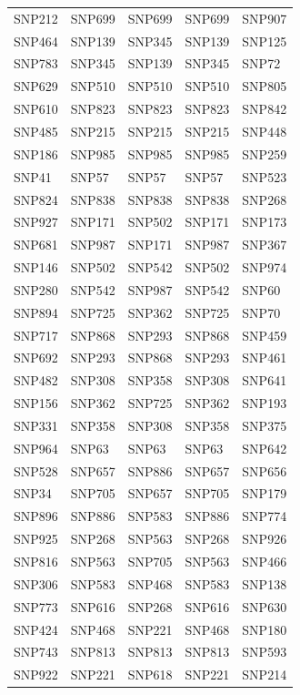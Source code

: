 \begin{table}[ht]
\begin{tabular}{lllll}
  SNP212 & SNP699 & SNP699 & SNP699 & SNP907 \\ 
  SNP464 & SNP139 & SNP345 & SNP139 & SNP125 \\ 
  SNP783 & SNP345 & SNP139 & SNP345 & SNP72 \\ 
  SNP629 & SNP510 & SNP510 & SNP510 & SNP805 \\ 
  SNP610 & SNP823 & SNP823 & SNP823 & SNP842 \\ 
  SNP485 & SNP215 & SNP215 & SNP215 & SNP448 \\ 
  SNP186 & SNP985 & SNP985 & SNP985 & SNP259 \\ 
  SNP41 & SNP57 & SNP57 & SNP57 & SNP523 \\ 
  SNP824 & SNP838 & SNP838 & SNP838 & SNP268 \\ 
  SNP927 & SNP171 & SNP502 & SNP171 & SNP173 \\ 
  SNP681 & SNP987 & SNP171 & SNP987 & SNP367 \\ 
  SNP146 & SNP502 & SNP542 & SNP502 & SNP974 \\ 
  SNP280 & SNP542 & SNP987 & SNP542 & SNP60 \\ 
  SNP894 & SNP725 & SNP362 & SNP725 & SNP70 \\ 
  SNP717 & SNP868 & SNP293 & SNP868 & SNP459 \\ 
  SNP692 & SNP293 & SNP868 & SNP293 & SNP461 \\ 
  SNP482 & SNP308 & SNP358 & SNP308 & SNP641 \\ 
  SNP156 & SNP362 & SNP725 & SNP362 & SNP193 \\ 
  SNP331 & SNP358 & SNP308 & SNP358 & SNP375 \\ 
  SNP964 & SNP63 & SNP63 & SNP63 & SNP642 \\ 
  SNP528 & SNP657 & SNP886 & SNP657 & SNP656 \\ 
  SNP34 & SNP705 & SNP657 & SNP705 & SNP179 \\ 
  SNP896 & SNP886 & SNP583 & SNP886 & SNP774 \\ 
  SNP925 & SNP268 & SNP563 & SNP268 & SNP926 \\ 
  SNP816 & SNP563 & SNP705 & SNP563 & SNP466 \\ 
  SNP306 & SNP583 & SNP468 & SNP583 & SNP138 \\ 
  SNP773 & SNP616 & SNP268 & SNP616 & SNP630 \\ 
  SNP424 & SNP468 & SNP221 & SNP468 & SNP180 \\ 
  SNP743 & SNP813 & SNP813 & SNP813 & SNP593 \\ 
  SNP922 & SNP221 & SNP618 & SNP221 & SNP214 \\ 

\end{tabular}
\end{table}
